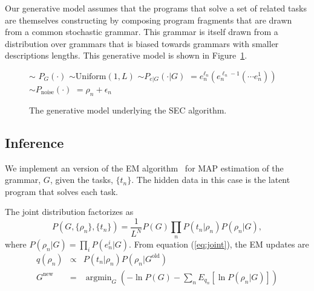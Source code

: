 \documentclass{article} %
\begin{document}
Our generative model assumes that the programs that solve a set of related tasks are themselves constructing by composing program fragments that are drawn from a common stochastic grammar. This grammar is itself drawn from a distribution over grammars that is biased towards grammars with smaller descriptions lengths. This generative model is shown in Figure~\ref{ref:gm}.

\begin{figure}
\begin{codebox}
\li {} $\sim$ $P_G(\cdot)$ 
\li {} $\sim\mbox{Uniform}(1, L)$ 
\li {}
\li {} $\sim P_{e|G}(\cdot | G)$
\li {} $= e_n^{\ell_n} (e_n^{\ell_n-1} ( \cdots e_n^{1}))$
\li {}
\li {} $\sim P_{\mbox{noise}}(\cdot)$
\li {} $= \rho_n + \epsilon_n$
\end{codebox}
\caption{The generative model underlying the SEC algorithm. \label{ref:gm}}
\end{figure}

\subsection{Inference}
We implement an version of the EM algorithm~\cite{dempster:1977} for MAP estimation of the grammar, $G$, given the tasks, $\{t_n\}$. The hidden data in this case is the latent program that solves each task.

The joint distribution factorizes as
\begin{equation}
P(G,\{\rho_n\},\{t_n\}) = \frac{1}{L^N} P(G) \prod_n P(t_n | \rho_n) P(\rho_n | G),
\label{eq:joint}
\end{equation}
where $P(\rho_n | G) = \prod_i P(e^i_n | G)$.
From equation (\ref{eq:joint}), the EM updates are
\begin{eqnarray}
q(\rho_n) &\propto& P(t_n | \rho_n) P(\rho_n | G^{\text{old}})\\
\label{eq:qdist}
G^{\text{new}} &=& \operatorname{argmin}_G \left( -\ln P(G) -
\sum_n 
E_{q_n}
 \left[ \ln P(\rho_n | G) \right] \right)
 \label{eq:gmax}
\end{eqnarray}
\end{document}
